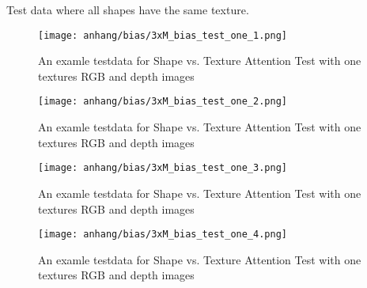 	\clearpage
	Test data where all shapes have the same texture.
	
	\begin{figure}[H]
		\centering
		\texttt{[image: anhang/bias/3xM\_bias\_test\_one\_1.png]}
		\caption[An examle testdata for Shape vs. Texture Attention Test with one textures RGB and depth images]{An examle testdata for Shape vs. Texture Attention Test with one textures RGB and depth images}
	\end{figure}
	\begin{figure}[H]
		\centering
		\texttt{[image: anhang/bias/3xM\_bias\_test\_one\_2.png]}
		\caption[An examle testdata for Shape vs. Texture Attention Test with one textures RGB and depth images]{An examle testdata for Shape vs. Texture Attention Test with one textures RGB and depth images}
	\end{figure}
	\begin{figure}[H]
		\centering
		\texttt{[image: anhang/bias/3xM\_bias\_test\_one\_3.png]}
		\caption[An examle testdata for Shape vs. Texture Attention Test with one textures RGB and depth images]{An examle testdata for Shape vs. Texture Attention Test with one textures RGB and depth images}
	\end{figure}
	\begin{figure}[H]
		\centering
		\texttt{[image: anhang/bias/3xM\_bias\_test\_one\_4.png]}
		\caption[An examle testdata for Shape vs. Texture Attention Test with one textures RGB and depth images]{An examle testdata for Shape vs. Texture Attention Test with one textures RGB and depth images}
	\end{figure}
	
	
	
	
	
	
	
	
	
	
	

